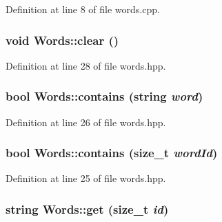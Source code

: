 Definition at line 8 of file words.cpp.

\hypertarget{class_words_a9423f1c5b91eb1f687b423576b9f72b9}{
\subsubsection[{clear}]{\setlength{\rightskip}{0pt plus 5cm}void Words::clear ()}}
\label{class_words_a9423f1c5b91eb1f687b423576b9f72b9}


Definition at line 28 of file words.hpp.

\hypertarget{class_words_af031f07fa8b3798d83348df0e822a9f2}{
\subsubsection[{contains}]{\setlength{\rightskip}{0pt plus 5cm}bool Words::contains (string {\em word})}}
\label{class_words_af031f07fa8b3798d83348df0e822a9f2}


Definition at line 26 of file words.hpp.

\hypertarget{class_words_a1fb2f028a8c2868286db3457a35b7b67}{
\subsubsection[{contains}]{\setlength{\rightskip}{0pt plus 5cm}bool Words::contains (size\_\-t {\em wordId})}}
\label{class_words_a1fb2f028a8c2868286db3457a35b7b67}


Definition at line 25 of file words.hpp.

\hypertarget{class_words_a41cf976d022be36c2dcf57977f463f5b}{
\subsubsection[{get}]{\setlength{\rightskip}{0pt plus 5cm}string Words::get (size\_\-t {\em id})}}
\label{class_words_a41cf976d022be36c2dcf57977f463f5b}


